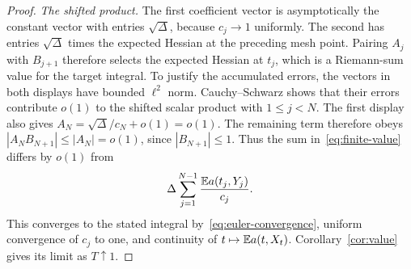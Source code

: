 \begin{proof}
\emph{The shifted product.}
The first coefficient vector is asymptotically the constant vector
with entries $\sqrt\Delta$, because $c_j\to1$ uniformly. The second
has entries $\sqrt\Delta$ times the expected Hessian at the preceding
mesh point. Pairing $A_j$ with $B_{j+1}$ therefore selects the expected
Hessian at $t_j$, which is a Riemann-sum value for the target integral.
To justify the accumulated errors, the vectors in both displays have
bounded $\ell^2$ norm. Cauchy--Schwarz shows that their errors contribute
$o(1)$ to the shifted scalar product with $1\leq j<N$. The first display also gives
$A_N=\sqrt\Delta/c_N+o(1)=o(1)$. The remaining term therefore obeys
$|A_NB_{N+1}|\leq|A_N|=o(1)$, since $|B_{N+1}|\leq1$.
Thus the sum in~\eqref{eq:finite-value} differs by $o(1)$ from
\[
 \Delta\sum_{j=1}^{N-1}\frac{\mathbb E a(t_j,Y_j)}{c_j}.
\]
This converges to the stated integral by~\eqref{eq:euler-convergence},
uniform convergence of $c_j$ to one, and continuity of
$t\mapsto\mathbb E a(t,X_t)$. Corollary~\ref{cor:value} gives its limit as
$T\uparrow1$.
\end{proof}
